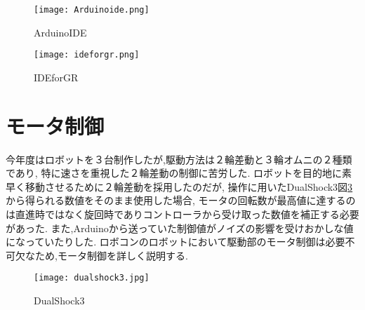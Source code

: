 \documentclass[12pt,oneside]{paper}
\begin{document}
\begin{figure}[H]
 \begin{center}
  \texttt{[image: Arduinoide.png]}
 \end{center}
 \caption{ArduinoIDE}
 \label{fig:ide}
\end{figure}


\begin{figure}[H]
 \begin{center}
  \texttt{[image: ideforgr.png]}
 \end{center}
 \caption{IDEforGR}
 \label{fig:idegr}
\end{figure}


\section{モータ制御}
今年度はロボットを３台制作したが,駆動方法は２輪差動と３輪オムニの２種類であり,
特に速さを重視した２輪差動の制御に苦労した.
ロボットを目的地に素早く移動させるために２輪差動を採用したのだが,
操作に用いたDualShock3図\ref{fig:ds3}から得られる数値をそのまま使用した場合,
モータの回転数が最高値に達するのは直進時ではなく旋回時でありコントローラから受け取った数値を補正する必要があった.
また,Arduinoから送っていた制御値がノイズの影響を受けおかしな値になっていたりした.
ロボコンのロボットにおいて駆動部のモータ制御は必要不可欠なため,モータ制御を詳しく説明する.
\begin{figure}[H]
 \begin{center}
  \texttt{[image: dualshock3.jpg]}
 \end{center}
 \caption{DualShock3}
 \label{fig:ds3}
\end{figure}
\end{document}
